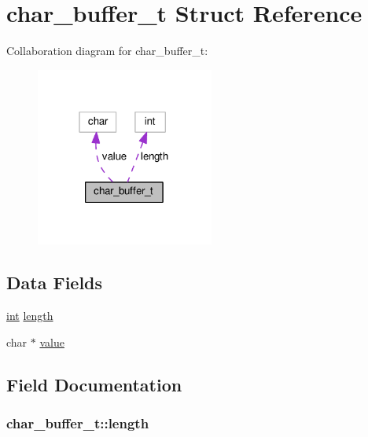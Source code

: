\hypertarget{structchar__buffer__t}{}\section{char\+\_\+buffer\+\_\+t Struct Reference}
\label{structchar__buffer__t}


Collaboration diagram for char\+\_\+buffer\+\_\+t\+:
\nopagebreak
\begin{figure}[H]
\begin{center}
\leavevmode
\includegraphics[width=166pt]{structchar__buffer__t__coll__graph}
\end{center}
\end{figure}
\subsection*{Data Fields}
\begin{DoxyCompactItemize}
\item 
\hyperlink{pcre_8txt_a42dfa4ff673c82d8efe7144098fbc198}{int} \hyperlink{structchar__buffer__t_a44ba6808e95596b1818a184f64e861a3}{length}
\item 
char $\ast$ \hyperlink{structchar__buffer__t_a93e7d3dbeb19740dcbae31b1c2acfc8c}{value}
\end{DoxyCompactItemize}


\subsection{Field Documentation}
\subsubsection[{\texorpdfstring{length}{length}}]{ char\+\_\+buffer\+\_\+t\+::length}\hypertarget{structchar__buffer__t_a44ba6808e95596b1818a184f64e861a3}{}\label{structchar__buffer__t_a44ba6808e95596b1818a184f64e861a3}

